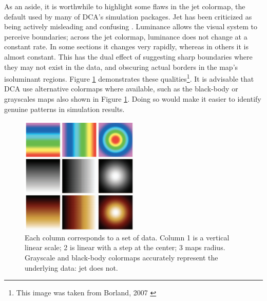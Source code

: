 \documentclass[11pt,a4paper,article]{memoir} %
\begin{document}
As an aside, it is worthwhile to highlight some flaws in the jet colormap, the default used by many of DCA's simulation packages. Jet has been criticized as being actively misleading and confusing \cite{borland2007rainbow}. Luminance allows the visual system to perceive boundaries; across the jet colormap, luminance does not change at a constant rate. In some sections it changes very rapidly, whereas in others it is almost constant. This has the dual effect of suggesting sharp boundaries where they may not exist in the data, and obscuring actual borders in the map's isoluminant regions. Figure \ref{fig:jet} demonstrates these qualities\footnote{This image was taken from Borland, 2007 \cite{borland2007rainbow}}. It is advisable that DCA use alternative colormaps where available, such as the black-body or grayscales maps also shown in Figure \ref{fig:jet}. Doing so would make it easier to identify genuine patterns in simulation results.
\begin{figure}
\centering
\includegraphics[width=0.5\textwidth]{jet.png}
\caption{\small{Each column corresponds to a set of data. Column 1 is a vertical linear scale; 2 is linear with a step at the center; 3 maps radius. Grayscale and black-body colormaps accurately represent the underlying data: jet does not.}}
\label{fig:jet}
\end{figure}

\end{document}
